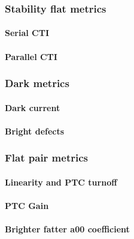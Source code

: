 \subsubsection{Stability flat metrics}\label{stability-flat-metrics}


\paragraph{Serial CTI}\label{serial-cti}




\paragraph{Parallel CTI}\label{parallel-cti}




\subsubsection{Dark metrics}\label{final-dark-metrics}

\paragraph{Dark current}\label{dark-current}




\paragraph{Bright defects}\label{final-bright-defects}

\subsubsection{Flat pair metrics}

\paragraph{Linearity and PTC turnoff}\label{final-linearity-and-ptc-turnoff}



\paragraph{PTC Gain}\label{final-ptc-gain}




\paragraph{\texorpdfstring{Brighter fatter a{00}
coefficient}{Brighter fatter a00 coefficient}}\label{final-brighter-fatter-a00-coefficient}



